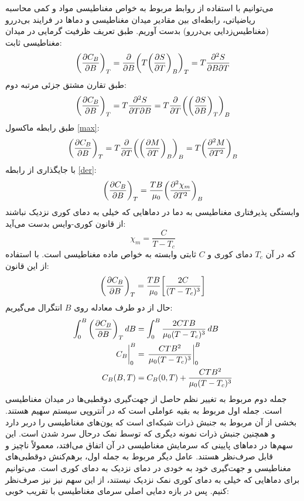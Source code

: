 \documentclass[12pt,a4paper]{article}
\newcommand\pdvc[3]{\qty(\pdv{#1}{#2})_{#3}}
\begin{document}
	می‌توانیم با استفاده از روابط مربوط به خواص مغناطیسی مواد و کمی محاسبه ریاضیاتی،
	رابطه‌ای بین مقادیر میدان مغناطیسی و دماها در فرایند بی‌دررو (مغناطیس‌زدایی بی‌دررو) بدست آوریم. طبق تعریف ظرفیت گرمایی در میدان مغناطیسی ثابت:
	\begin{equation}
		\pdvc{C_B}{B}{T} = \pdv{B}\qty(T\pdvc{S}{T}{B})_T = T\pdv{S}{B}{T}
	\end{equation}
	طبق تقارن مشتق جزئی مرتبه دوم:
	\begin{equation}
		\pdvc{C_B}{B}{T} = T\pdv{S}{T}{B} = T\pdv{T}\qty(\pdvc{S}{B}{T})_B
	\end{equation}
	طبق رابطه ماکسول \eqref{max}:
	\begin{equation}
		\pdvc{C_B}{B}{T} = T\pdv{T}\qty(\pdvc{M}{T}{B})_B = T\qty(\pdv[2]{M}{T})_B
	\end{equation}
	با جایگذاری از رابطه \eqref{der}:
	\begin{equation}
		\pdvc{C_B}{B}{T} = \frac{T B}{\mu_0}\qty(\pdv[2]{\chi_m}{T})_B
	\end{equation}
	وابستگی پذیرفتاری مغناطیسی به دما در دماهایی که خیلی به دمای کوری نزدیک نباشند از قانون کوری-وایس بدست می‌آید:
	\begin{equation}
		\chi_m = \frac{C}{T-T_c}
	\end{equation}
	که در آن $T_c$ دمای کوری و $C$ ثابتی وابسته به خواص ماده مغناطیسی است. با استفاده از این قانون:
	\begin{equation}
		\pdvc{C_B}{B}{T} = \frac{T B}{\mu_0}\qty[\frac{2C}{(T-T_c)^3}]
	\end{equation}
	حال از دو طرف معادله روی $B$ انتگرال می‌گیریم:
	\begin{align}
		\int_0^B \pdvc{C_B}{B}{T}\mathop{dB} &= \int_0^B \frac{2 C T B}{\mu_0(T-T_c)^3}\mathop{dB} \\
		\eval{C_B}_0^B &= \eval{\frac{C T B^2}{\mu_0(T-T_c)^3}}_0^B  \\
		C_B(B, T) &= C_B(0, T) + \frac{C T B^2}{\mu_0(T-T_c)^3}
	\end{align}
	جمله دوم مربوط به تغییر نظم حاصل از جهت‌گیری دوقطبی‌ها در میدان مغناطیسی است. جمله اول مربوط به بقیه عواملی است که در آنتروپی سیستم سهیم هستند.
	بخشی از آن مربوط به جنبش ذرات شبکه‌ای است که یون‌های مغناطیسی را دربر دارد و همچنین جنبش ذرات نمونه دیگری که توسط نمک درحال سرد شدن است.
	این سهم‌ها در دما‌های پایینی که سرمایش مغناطیسی در آن اتفاق می‌افتد، معمولاً ناچیز و قابل صرف‌نظر هستند.
	عامل دیگر مربوط به جمله اول، برهم‌کنش دوقطبی‌های مغناطیسی و جهت‌گیری خود به خودی در دمای نزدیک به دمای کوری است.
	می‌توانیم برای دما‌هایی که خیلی به دمای کوری نمک نزدیک نیستند، از این سهم نیز نیز صرف‌نظر کنیم. پس در بازه دمایی اصلی سرمای مغناطیسی با تقریب خوبی:
\end{document}
